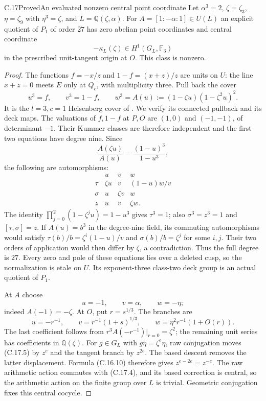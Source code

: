 \begin{statement}{C.17}{Proved}{An evaluated nonzero central point coordinate}
Let $\alpha^3=2$, $\zeta=\zeta_3$, $\eta=\zeta_9$
with $\eta^3=\zeta$, and $L=\mathbb Q(\zeta,\alpha)$.
For $A=[1:-\alpha:1]\in U(L)$ an explicit quotient
of $P_1$ of order $27$ has zero abelian point
coordinates and central coordinate
\[
                  -\kappa_L(\zeta)\in
                    H^1(G_L,\mathbb F_3)                  \tag{C.17.1}
\]
in the prescribed unit-tangent origin at $O$.
This class is nonzero.
\end{statement}
\begin{proof}
The functions $f=-x/z$ and $1-f=(x+z)/z$
are units on $U$: the line $x+z=0$ meets $E$
only at $Q_c$, with multiplicity three.
Pull back the cover
\[
 u^3=f,\qquad v^3=1-f,\qquad
 w^3=A(u):=(1-\zeta u)(1-\zeta^2u)^2.                      \tag{C.17.2}
\]
It is the $l=3,c=1$ Heisenberg cover of
\cite[\S2.1, (2.1.2), Theorem 2.1.4]
{BC_HiranoMorishita2019}.  We verify its
connected pullback and its deck maps.
The valuations of $f,1-f$ at $P,O$ are
$(1,0)$ and $(-1,-1)$, of determinant $-1$.
Their Kummer classes are therefore independent
and the first two equations have degree nine.
Since
\[
 \frac{A(\zeta u)}{A(u)}
                 =\frac{(1-u)^3}{1-u^3},                  \tag{C.17.3}
\]
the following are automorphisms:
\[
 \begin{array}{c|ccc}
       &u&v&w\\ \hline
 \tau  &\zeta u&v&(1-u)w/v\\
 \sigma&u&\zeta v&w\\
 z     &u&v&\zeta w .
 \end{array}                                              \tag{C.17.4}
\]
The identity $\prod_{j=0}^2(1-\zeta^ju)=1-u^3$
gives $\tau^3=1$; also $\sigma^3=z^3=1$
and $[\tau,\sigma]=z$.
If $A(u)=b^3$ in the degree-nine field, its
commuting automorphisms would satisfy
$\tau(b)/b=\zeta^i(1-u)/v$ and
$\sigma(b)/b=\zeta^j$ for some $i,j$.
Their two orders of application would then
differ by $\zeta$, a contradiction.
Thus the full degree is $27$.
Every zero and pole of these equations lies
over a deleted cusp, so the normalization
is etale on $U$.  Its exponent-three
class-two deck group is an actual quotient
of $P_1$.

At $A$ choose
\[
                 u=-1,\qquad v=\alpha,\qquad w=-\eta;
                                                               \tag{C.17.5}
\]
indeed $A(-1)=-\zeta$.
At $O$, put $r=s^{1/3}$.  The branches are
\[
 u=-r^{-1},\qquad
 v=r^{-1}(1+s)^{1/3},\qquad
 w=\eta^2r^{-1}(1+O(r)).                                   \tag{C.17.6}
\]
The last coefficient follows from
$r^3A(-r^{-1})|_{r=0}=\zeta^2$; the
remaining unit series has coefficients
in $\mathbb Q(\zeta)$.
For $g\in G_L$ with $g\eta=\zeta^e\eta$,
raw conjugation moves (C.17.5) by $z^e$
and the tangent branch by $z^{2e}$.
The based descent removes the latter
displacement.  Formula (C.16.10) therefore
gives $z^{e-2e}=z^{-e}$.
The raw arithmetic action commutes with
(C.17.4), and its based correction is
central, so the arithmetic action on the
finite group over $L$ is trivial.
Geometric conjugation fixes this central
cocycle.


\end{proof}

